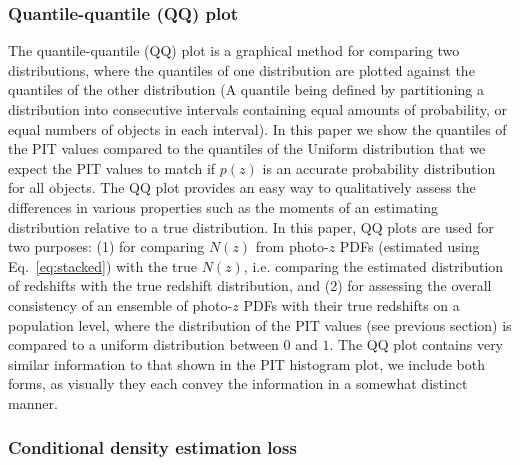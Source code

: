 \documentclass[usenatbib]{mn2e}
\newcommand{\red}[1]{\textcolor{red}{#1}}
\newcommand{\aim}[1]{\textcolor{green}{#1}}%
\newcommand{\blue}[1]{\textcolor{blue}{#1}}%
\begin{document}
\subsubsection{Quantile-quantile (QQ) plot}
\label{sec:qq}

The quantile-quantile (QQ) plot is a graphical method for comparing two distributions, where the quantiles of one distribution are plotted against the quantiles of the other distribution (A quantile being defined by partitioning a distribution into consecutive intervals containing equal amounts of probability, or equal numbers of objects in each interval). 
In this paper we show the quantiles of the PIT values compared to the quantiles of the Uniform distribution that we expect the PIT values to match if $p(z)$ is an accurate probability distribution for all objects.
The QQ plot provides an easy way to qualitatively assess the differences in various properties such as the moments of an estimating distribution relative to a true distribution.  
In this paper, QQ plots are used for two purposes: (1) for comparing $N(z)$ from photo-$z$ PDFs (estimated using Eq.~\ref{eq:stacked}) with the true $N(z)$, i.e. comparing the estimated distribution of redshifts with the true redshift distribution, and (2) for assessing the overall consistency of an ensemble of photo-$z$ PDFs with their true redshifts on a population level, where the distribution of the PIT values (see previous section) is compared to a uniform distribution between $0$ and $1$.  The QQ plot contains very similar information to that shown in the PIT histogram plot, we include both forms, as visually they each convey the information in a somewhat distinct manner. %

\subsubsection{Conditional density estimation loss}
\label{sec:CDE_loss}
\end{document}
